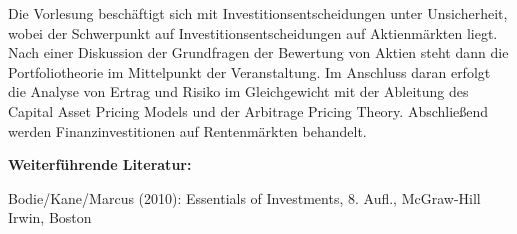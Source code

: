 \begin{course}
\begin{learningoutcomes}
\end{learningoutcomes}

\begin{content}
Die Vorlesung beschäftigt sich mit Investitionsentscheidungen unter Unsicherheit, wobei der Schwerpunkt auf Investitionsentscheidungen auf Aktienmärkten liegt. Nach einer Diskussion der Grundfragen der Bewertung von Aktien steht dann die Portfoliotheorie im Mittelpunkt der Veranstaltung. Im Anschluss daran erfolgt die Analyse von Ertrag und Risiko im Gleichgewicht mit der Ableitung des Capital Asset Pricing Models und der Arbitrage Pricing Theory. Abschließend werden Finanzinvestitionen auf Rentenmärkten behandelt.


\end{content}



\begin{literature}\textbf{Weiterführende Literatur:}

 

Bodie/Kane/Marcus (2010): Essentials of Investments, 8. Aufl., McGraw-Hill Irwin, Boston

\end{literature}



\end{course}
